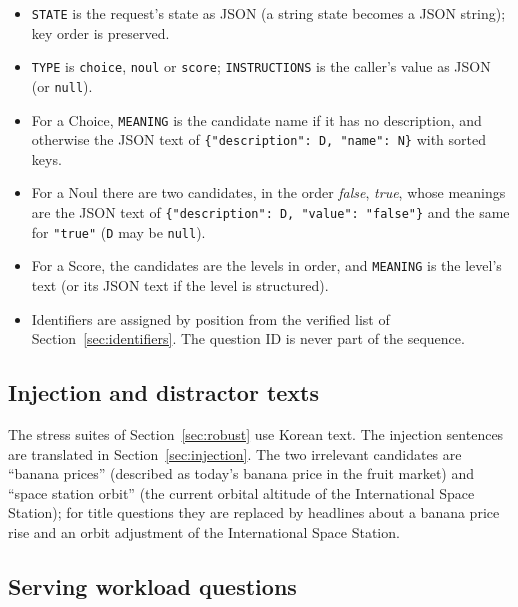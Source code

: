 \begin{itemize}
  \item \texttt{STATE} is the request's state as JSON (a string state becomes a JSON string);
    key order is preserved.
  \item \texttt{TYPE} is \texttt{choice}, \texttt{noul} or \texttt{score};
    \texttt{INSTRUCTIONS} is the caller's value as JSON (or \texttt{null}).
  \item For a Choice, \texttt{MEANING} is the candidate name if it has no description, and
    otherwise the JSON text of \texttt{\{"description": D, "name": N\}} with sorted keys.
  \item For a Noul there are two candidates, in the order \emph{false}, \emph{true}, whose
    meanings are the JSON text of \texttt{\{"description": D, "value": "false"\}} and the
    same for \texttt{"true"} (\texttt{D} may be \texttt{null}).
  \item For a Score, the candidates are the levels in order, and \texttt{MEANING} is the
    level's text (or its JSON text if the level is structured).
  \item Identifiers are assigned by position from the verified list of
    Section~\ref{sec:identifiers}. The question ID is never part of the sequence.
\end{itemize}

\subsection{Injection and distractor texts}

The stress suites of Section~\ref{sec:robust} use Korean text. The injection sentences are
translated in Section~\ref{sec:injection}. The two irrelevant candidates are ``banana
prices'' (described as today's banana price in the fruit market) and ``space station orbit''
(the current orbital altitude of the International Space Station); for title questions they
are replaced by headlines about a banana price rise and an orbit adjustment of the
International Space Station.

\subsection{Serving workload questions}

